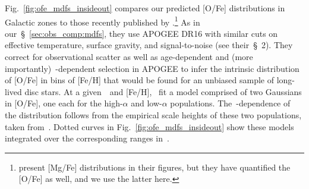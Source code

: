 \documentclass[draft2.tex]{subfiles}
\begin{document}
Fig.~\ref{fig:ofe_mdfs_insideout} compares our predicted [O/Fe] distributions 
in Galactic zones to those recently published by 
\citet{Vincenzo2021a}.\footnote{
	\citet{Vincenzo2021a} present [Mg/Fe] distributions in their figures, but 
	they have quantified the [O/Fe] as well, and we use the latter here. 
}
As in our~\S~\ref{sec:obs_comp:mdfs}, they use APOGEE DR16 with similar cuts on 
effective temperature, surface gravity, and signal-to-noise (see their~\S~2). 
They correct for observational scatter as well as age-dependent and (more 
importantly)~\absz-dependent selection in APOGEE to infer the intrinsic 
distribution of [O/Fe] in bins of [Fe/H] that would be found for an unbiased 
sample of long-lived disc stars. 
At a given~\rgal~and [Fe/H],~\citet{Vincenzo2021a} fit a model comprised of two 
Gaussians in [O/Fe], one each for the high-$\alpha$ and low-$\alpha$ 
populations.
The~\absz-dependence of the distribution follows from the empirical scale 
heights of these two populations, taken from~\citet{Bovy2016}. 
Dotted curves in Fig.~\ref{fig:ofe_mdfs_insideout} show these models integrated 
over the corresponding ranges in~\absz. 
\end{document}
